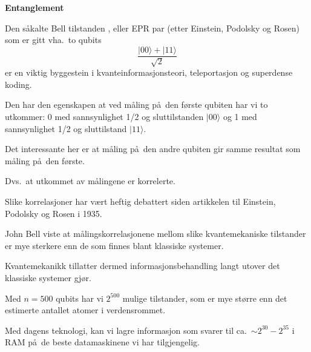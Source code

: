 \Large
\begin{center}
   \begin{minipage}{0.8\textwidth}
       \vspace*{0.5cm}
       \begin{center}
            { \LARGE \bf Entanglement}
       \end{center}
Den s\aa kalte Bell tilstanden , eller EPR par (etter Einstein, Podolsky
og Rosen) 
som er gitt vha.~to qubits
\[
   \frac{|00\rangle + |11\rangle}{\sqrt{2}}
\]
er en viktig byggestein i kvanteinformasjonsteori, teleportasjon og
superdense koding.

Den har den egenskapen at ved m\aa ling p\aa\ den f\o rste
qubiten har vi to utkommer: 0 med sannsynlighet 1/2 og sluttilstanden
$|00\rangle$ og 1 med
sannsynlighet 1/2 og sluttilstand $|11\rangle$.

Det interessante her er at m\aa ling p\aa\ den andre qubiten gir samme
resultat som m\aa ling p\aa\ den f\o rste.

Dvs.~at utkommet av m\aa lingene er korrelerte.

Slike korrelasjoner har v\ae rt heftig debattert siden artikkelen til  
Einstein, Podolsky
og Rosen i 1935. 

John Bell viste at m\aa lingskorrelasjonene mellom slike kvantemekaniske
tilstander er mye sterkere enn de som finnes blant klassiske
systemer. 

Kvantemekanikk tillatter dermed informasjonsbehandling langt utover det klassiske systemer gj\o r. 

Med $n=500$ qubits har vi $2^{500}$ mulige tilstander, som er mye st\o rre
enn det estimerte antallet atomer i verdensrommet.

Med dagens teknologi, kan vi lagre informasjon som svarer til
ca.~$\sim 2^{30}-2^{35}$ i RAM p\aa\ de beste datamaskinene vi har
tilgjengelig. 

\end{minipage}
\end{center}



